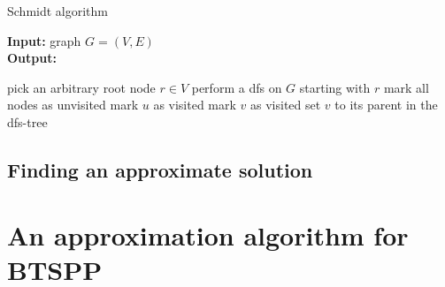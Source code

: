 \begin{algorithm}[ht!]
  \caption{Schmidt algorithm}\label{alg:schmidt}
  \textbf{Input: } graph \(G = (V, E)\)\\
  \textbf{Output: }
  \begin{algorithmic}[1]
      \State pick an arbitrary root node \(r \in V\)
      \State perform a \gls{dfs} on \(G\) starting with \(r\)
        \State{}
      \EndIf
      \State mark all nodes as unvisited
            \State mark \(u\) as visited
              \State mark \(v\) as visited
              \State set \(v\) to its parent in the \gls{dfs}-tree
                \State{}
              \EndIf
            \EndWhile
          \EndIf
        \EndFor
      \EndFor
          \State{}
        \EndIf
      \EndFor
      \State{}
    \EndProcedure
  \end{algorithmic}
\end{algorithm}

\subsection{Finding an approximate solution}

\section{An approximation algorithm for BTSPP}